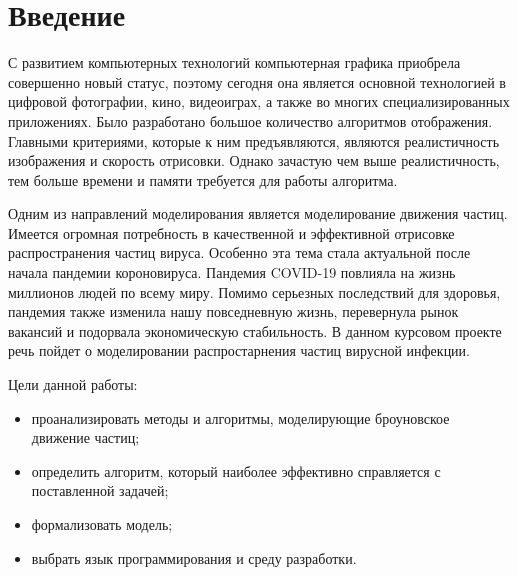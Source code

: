 \chapter*{Введение}

 С развитием компьютерных технологий компьютерная графика приобрела совершенно новый статус, поэтому сегодня она является основной технологией в цифровой фотографии, кино, видеоиграх, а также во многих специализированных приложениях. Было разработано большое количество алгоритмов отображения. Главными критериями, которые к ним предъявляются, являются реалистичность изображения и скорость отрисовки. Однако зачастую чем выше реалистичность, тем больше времени и памяти требуется для работы алгоритма.

Одним из направлений моделирования является моделирование движения частиц. Имеется огромная потребность в качественной и эффективной отрисовке распространения частиц вируса. Особенно эта тема стала актуальной после начала пандемии короновируса. Пандемия COVID-19 повлияла на жизнь миллионов людей по всему миру. Помимо серьезных последствий для здоровья, пандемия также изменила нашу повседневную жизнь, перевернула рынок вакансий и подорвала экономическую стабильность. В данном курсовом проекте речь пойдет о моделировании распростарнения частиц вирусной инфекции.

Цели данной работы:

\begin{itemize}
	\item проанализировать методы и алгоритмы, моделирующие броуновское движение частиц; 
	\item определить алгоритм, который наиболее эффективно справляется с поставленной задачей;
	\item формализовать модель;
	\item выбрать язык программирования и среду разработки.
\end{itemize}
